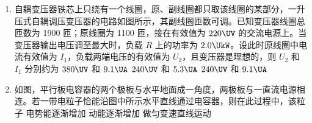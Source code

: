 \documentclass[\gkver]{gaokaozhenti}
\begin{document}
\begin{enumerate}
{受力分析如图所示：重力的大小方向都不变，可知 $N_{1}$、$N_{2}$ 的合力大小、方向都不变，当木板向下转动时，$N_{1}$、$N_{2}$ 变化如图所示，即 $N_{1}$、$N_{2}$ 都减小，所以正确选项为 B。
}

\item
自耦变压器铁芯上只绕有一个线圈，原、副线圈都只取该线圈的某部分，一升压式自耦调压变压器的电路如图所示，其副线圈匝数可调。已知变压器线圈总匝数为 1900 匝；原线圈为 1100 匝，接在有效值为 $220\UV$ 的交流电源上。当变压器输出电压调至最大时，负载 $R$ 上的功率为 $2.0\UkW$。设此时原线圈中电流有效值为 $I_{1}$，负载两端电压的有效值为 $U_{2}$，且变压器是理想的，则 $U_{2}$ 和 $I_{1}$ 分别约为
{$380\UV$ 和 $9.1\UA$}
{$240\UV$ 和 $5.3\UA$}
{$240\UV$ 和 $9.1\UA$}

\item
如图，平行板电容器的两个极板与水平地面成一角度，两极板与一直流电源相连。若一带电粒子恰能沿图中所示水平直线通过电容器，则在此过程中，该粒子
{电势能逐渐增加}
{动能逐渐增加}
{做匀变速直线运动}


\end{enumerate}
\end{document}
